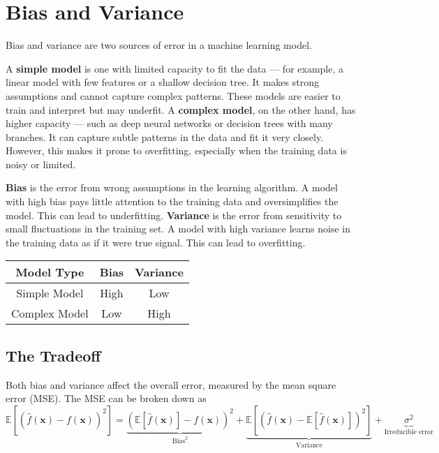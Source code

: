 \section{Bias and Variance}

Bias and variance are two sources of error in a machine learning model. 

A \textbf{simple model} is one with limited capacity to fit the data — for example, a linear model with few features or a shallow decision tree. It makes strong assumptions and cannot capture complex patterns. These models are easier to train and interpret but may underfit. A \textbf{complex model}, on the other hand, has higher capacity — such as deep neural networks or decision trees with many branches. It can capture subtle patterns in the data and fit it very closely. However, this makes it prone to overfitting, especially when the training data is noisy or limited.

\textbf{Bias} is the error from wrong assumptions in the learning algorithm. A model with high bias pays little attention to the training data and oversimplifies the model. This can lead to underfitting. \textbf{Variance} is the error from sensitivity to small fluctuations in the training set. A model with high variance learns noise in the training data as if it were true signal. This can lead to overfitting.

\begin{center}
\begin{tabular}{|c|c|c|}
\hline
\textbf{Model Type} & \textbf{Bias} & \textbf{Variance} \\
\hline
Simple Model & High & Low \\
\hline
Complex Model & Low & High \\
\hline
\end{tabular}
\end{center}

\subsection{The Tradeoff}

Both bias and variance affect the overall error, measured by the mean square error (MSE). The MSE can be broken down as
\[
\mathbb{E}\left[(\hat{f}(\mathbf{x}) - f(\mathbf{x}))^2\right] = \underbrace{(\mathbb{E}[\hat{f}(\mathbf{x})] - f(\mathbf{x}))^2}_{\text{Bias}^2} + \underbrace{\mathbb{E}[(\hat{f}(\mathbf{x}) - \mathbb{E}[\hat{f}(\mathbf{x})])^2]}_{\text{Variance}} + \underbrace{\sigma^2}_{\text{Irreducible error}}
\]

